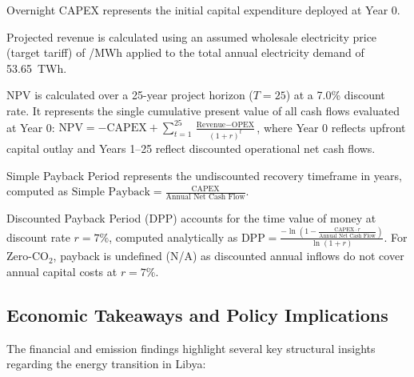 \documentclass[preprint,12pt]{elsarticle}
\begin{document}
\begin{table}[htbp]
\begin{threeparttable}
\begin{tablenotes}
\footnotesize
\item[a] Overnight CAPEX represents the initial capital expenditure deployed at Year 0.
\item[b] Projected revenue is calculated using an assumed wholesale electricity price (target tariff) of /MWh applied to the total annual electricity demand of 53.65~TWh.
\item[c] NPV is calculated over a 25-year project horizon ($T = 25$) at a 7.0\% discount rate. It represents the single cumulative present value of all cash flows evaluated at Year 0: $\text{NPV} = -\text{CAPEX} + \sum_{t=1}^{25} \frac{\text{Revenue} - \text{OPEX}}{(1 + r)^t}$, where Year 0 reflects upfront capital outlay and Years 1--25 reflect discounted operational net cash flows.
\item[d] Simple Payback Period represents the undiscounted recovery timeframe in years, computed as $\text{Simple Payback} = \frac{\text{CAPEX}}{\text{Annual Net Cash Flow}}$.
\item[e] Discounted Payback Period (DPP) accounts for the time value of money at discount rate $r = 7\%$, computed analytically as $\text{DPP} = \frac{-\ln\left(1 - \frac{\text{CAPEX} \cdot r}{\text{Annual Net Cash Flow}}\right)}{\ln(1 + r)}$. For Zero-$\text{CO}_2$, payback is undefined (N/A) as discounted annual inflows do not cover annual capital costs at $r = 7\%$.
\end{tablenotes}
\end{threeparttable}
\end{table}

\subsection{Economic Takeaways and Policy Implications}
The financial and emission findings highlight several key structural insights regarding the energy transition in Libya:
\end{document}
